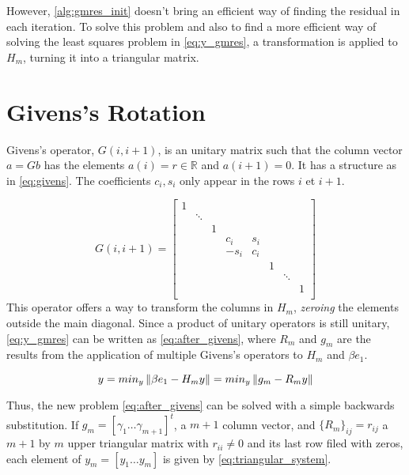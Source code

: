 However, \ref{alg:gmres_init} doesn't bring an efficient way of finding the residual in each iteration. To solve this problem and also to find a more efficient way of solving the least squares problem in \ref{eq:y_gmres}, a transformation is applied to $H_{m}$, turning it into a triangular matrix.

\section{Givens's Rotation}

Givens's operator, $G(i,i+1)$, is an unitary matrix such that the column vector $a = Gb$ has the elements $a(i) = r \in \mathbb{R}$ and $a(i+1)=0$. It has a structure as in \ref{eq:givens}. The coefficients $c_{i},s_{i}$ only appear in the rows $i$ et $i+1$.

\begin{equation}\label{eq:givens}
    G(i,i+1)=
    \begin{bmatrix}
        1 &        &   &        &       &   &        &   \\
          & \ddots &   &        &       &   &        &   \\
          &        & 1 &        &       &   &        &   \\
          &        &   & c_{i}  & s_{i} &   &        &   \\
          &        &   & -s_{i} & c_{i} &   &        &   \\
          &        &   &        &       & 1 &        &   \\
          &        &   &        &       &   & \ddots &   \\
          &        &   &        &       &   &        & 1 \\
    \end{bmatrix}
\end{equation}
This operator offers a way to transform the columns in $H_{m}$, \textit{zeroing} the elements outside the main diagonal. Since a product of unitary operators is still unitary, \ref{eq:y_gmres} can be written as \ref{eq:after_givens}, where $R_{m}$ and $g_{m}$ are the results from the application of multiple Givens's operators to $H_{m}$ and $\beta e_{1}$.

\begin{equation}\label{eq:after_givens}
    y = min_{y} \left\lVert\beta e_{1} - H_{m}y\right\rVert = min_{y} \left\lVert g_{m} - R_{m}y\right\rVert
\end{equation}


Thus, the new problem \ref{eq:after_givens} can be solved with a simple backwards substitution. If $g_{m} = [\gamma_{1} \dots \gamma_{m+1}]^{t}$, a $m+1$ column vector, and $\{ R_{m} \}_{ij} = r_{ij}$ a $m+1$ by $m$ upper triangular matrix with $r_{ii} \neq 0$ and its last row filed with zeros, each element of $y_{m} = [y_{1} \dots y_{m}]$ is given by \ref{eq:triangular_system}.

